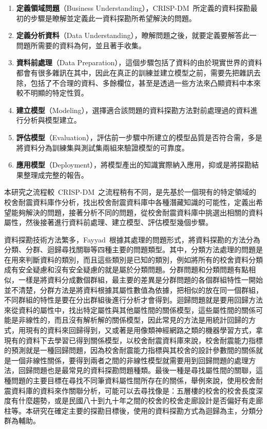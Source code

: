 \begin{enumerate}
\item \textbf{定義領域問題}（Business Understanding），CRISP-DM~所定義的資料探勘最初的步驟是瞭解並定義此一資料探勘所希望解決的問題。
\item \textbf{定義分析資料}（Data Understanding），瞭解問題之後，就要定義要解答此一問題所需要的資料為何，並且著手收集。
\item \textbf{資料前處理}（Data Preparation），這個步驟包括了資料的由於現實世界的資料都會有很多雜訊在其中，因此在真正的訓練並建立模型之前，需要先把雜訊去除，包括了不合理的資料、多餘欄位，甚至是透過一些方法來凸顯資料中本來較不明顯的特定性質。
\item \textbf{建立模型}（Modeling），選擇適合該問題的資料探勘方法對前處理過的資料進行分析與模型建立。
\item \textbf{評估模型}（Evaluation），評估前一步驟中所建立的模型品質是否符合需，多是將資料分為訓練集與測試集兩組來驗證模型的可靠度。
\item \textbf{應用模型}（Deployment），將模型產出的知識實際納入應用，抑或是將探勘結果整理成完整的報告。
\end{enumerate}

本研究之流程較~CRISP-DM~之流程稍有不同，是先基於一個現有的特定領域的校舍耐震資料庫作分析，找出校舍耐震資料庫中各種潛藏知識的可能性，定義出希望能夠解決的問題，接著分析不同的問題，從校舍耐震資料庫中挑選出相關的資料屬性，然後接著進行資料前處理、建立模型、評估模型幾個步驟。

資料探勘技術方法繁多，Fayyad~\cite{fayyad1996data}根據其處理的問題形式，將資料探勘的方法分為分類、分群、迴歸尋找關聯等四種主要的問題類型。其中，分類方法處理的問題是在用來判斷資料的類別，而且這些類別是已知的類別，例如將所有的校舍資料分類成有安全疑慮和沒有安全疑慮的就是屬於分類問題。分群問題和分類問題有點相似，一樣是將資料分成數個群組，最主要的差異是分群問題的各個群組特性一開始並不清楚，分群方法是將資料根據其屬性數值為依據，把相似的放在同一個群組，不同群組的特性是要在分出群組後進行分析才會得到。迴歸問題就是要用回歸方法來從資料的屬性中，找出特定屬性與其他屬性間的關係模型，這些屬性間的關係可能是非線性的，而且沒有解析解的關係模型，因此常見的方法是用統計回歸的方式，用現有的資料來回歸得到，又或著是用像類神經網路之類的機器學習方式，拿現有的資料下去學習已得到關係模型，以校舍耐震資料庫來說，校舍耐震能力指標的預測就是一種回歸問題，因為校舍耐震能力指標與其校舍的設計參數間的關係就是一個非線性關係，要得到兩者之間的非線性模型就需要用到回歸問題的處理方法，回歸問題也是最常見的資料探勘問題種類。最後一種是尋找屬性間的關聯，這種問題的主要目標在尋找不同筆資料屬性間所存在的關係，舉例來說，使用校舍耐震資料庫的資料來作關聯分析，可能可以去尋找像是：五層樓的校舍的校舍長度深度有什麼趨勢，或是民國八十到九十年之間的校舍的校舍走廊設計是否偏好有走廊柱等。本研究在確定主要的探勘目標後，使用的資料探勘方式為迴歸為主，分類分群為輔助。

